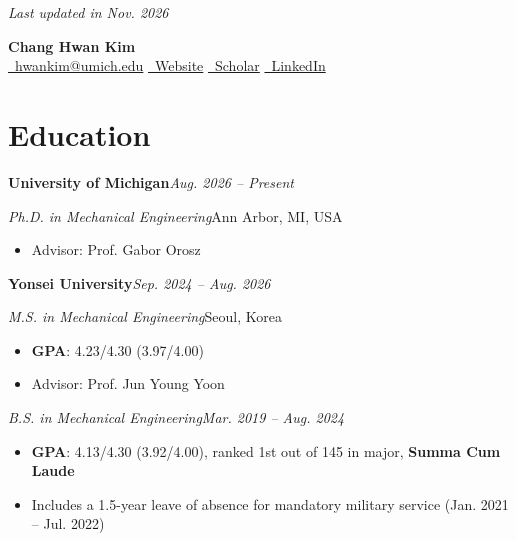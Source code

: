 \documentclass[10pt,letterpaper]{article}
\newcommand{\contact}[3]{\href{#2}{#1~#3}}
\newcommand{\entry}[4]{\textbf{#1}\hfill\textit{#2}\par\nopagebreak\textit{#3}\hfill{#4}\par\nopagebreak}
\newcommand{\subline}[2]{\textit{#1}\hfill{#2}\par\nopagebreak}
\newcommand{\entrygap}{\vspace{3pt}}
\begin{document}
\vspace*{-6pt}
\hfill{\color{softgray}\small\textit{Last updated in Nov. 2026}}\par
\vspace{2pt}
\begin{center}
{\fontsize{24pt}{28pt}\selectfont\bfseries Chang Hwan Kim}\\[7pt]
\small
\contact{\faEnvelope[regular]}{mailto:hwankim@umich.edu}{hwankim@umich.edu}\hspace{1.4em}
\contact{\faGlobe}{https://chang-hwan-kim1.github.io/}{Website}\hspace{1.4em}
\contact{\faGraduationCap}{https://scholar.google.com/citations?user=DUZ1KAoAAAAJ}{Scholar}\hspace{1.4em}
\contact{\faLinkedinIn}{https://www.linkedin.com/in/chang-hwan-kim-24aa1b316/}{LinkedIn}
\end{center}
\vspace{-8pt}

\section{Education}
\entry{University of Michigan}{Aug. 2026 -- Present}{Ph.D. in Mechanical Engineering}{Ann Arbor, MI, USA}
\begin{itemize}
  \item Advisor: Prof. Gabor Orosz
\end{itemize}
\entrygap
\entry{Yonsei University}{Sep. 2024 -- Aug. 2026}{M.S. in Mechanical Engineering}{Seoul, Korea}
\begin{itemize}
  \item \textbf{GPA}: 4.23/4.30 (3.97/4.00)
  \item Advisor: Prof. Jun Young Yoon
\end{itemize}
\entrygap
\subline{B.S. in Mechanical Engineering}{\textit{Mar. 2019 -- Aug. 2024}}
\begin{itemize}
  \item \textbf{GPA}: 4.13/4.30 (3.92/4.00), ranked 1st out of 145 in major, \textbf{Summa Cum Laude}
  \item Includes a 1.5-year leave of absence for mandatory military service (Jan. 2021 -- Jul. 2022)
\end{itemize}
\end{document}
